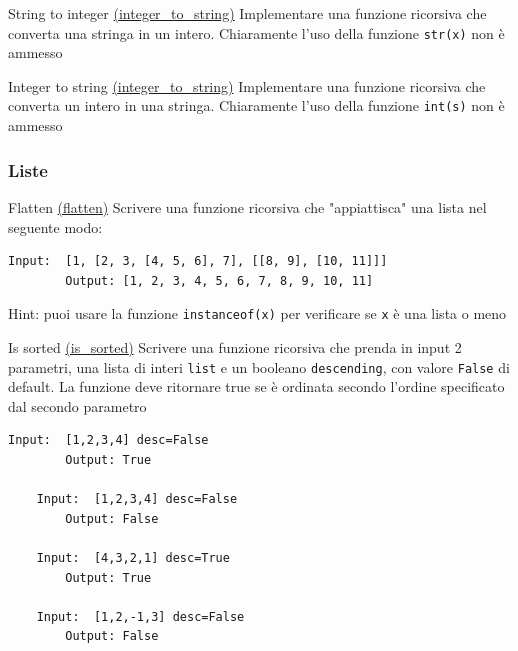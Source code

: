 \begin{esercizio}{String to integer \href{run:./files/python/esercizi/ricorsione}{(integer\_to\_string)}}
	Implementare una funzione ricorsiva che converta una stringa in un intero. Chiaramente l'uso della funzione \verb|str(x)| non è ammesso
\end{esercizio}

\begin{esercizio}{Integer to string \href{run:./files/python/esercizi/ricorsione}{(integer\_to\_string)}}
	Implementare una funzione ricorsiva che converta un intero in una stringa. Chiaramente l'uso della funzione \verb|int(s)| non è ammesso
\end{esercizio}


\subsubsection{Liste}

\begin{esercizio}{Flatten \href{run:./files/python/esercizi/ricorsione}{(flatten)}}
	Scrivere una funzione ricorsiva che "appiattisca" una lista nel seguente modo:
	\begin{lstlisting}[frame = none]
		Input:  [1, [2, 3, [4, 5, 6], 7], [[8, 9], [10, 11]]]
		Output: [1, 2, 3, 4, 5, 6, 7, 8, 9, 10, 11]
  \end{lstlisting}
	Hint: puoi usare la funzione \verb|instanceof(x)| per verificare se \verb|x| è una lista o meno
\end{esercizio}

\begin{esercizio}{Is sorted \href{run:./files/python/esercizi/ricorsione}{(is\_sorted)}}
	Scrivere una funzione ricorsiva che prenda in input 2 parametri, una lista di interi \verb|list| e un booleano \verb|descending|, con valore \verb|False| di default. La funzione deve ritornare true se è ordinata secondo l'ordine specificato dal secondo parametro
	\begin{lstlisting}[frame = none]
    Input:  [1,2,3,4] desc=False
		Output: True

    Input:  [1,2,3,4] desc=False
		Output: False

    Input:  [4,3,2,1] desc=True
		Output: True

    Input:  [1,2,-1,3] desc=False
		Output: False
  \end{lstlisting}

\end{esercizio}


